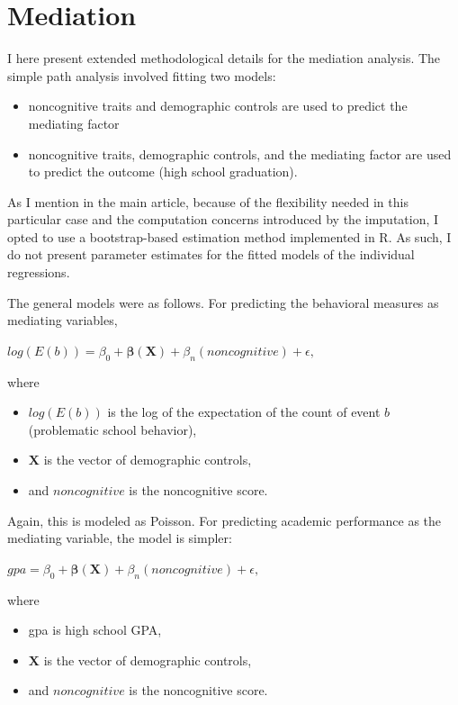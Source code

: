 \documentclass[11pt]{article}
\begin{document}
\section{Mediation}
I here present extended methodological details for the mediation analysis. The simple path analysis involved fitting two models: 
\begin{itemize}\itemsep1pt \parskip0pt 
	\item noncognitive traits and demographic controls are used to predict the mediating factor
	\item noncognitive traits, demographic controls, and the mediating factor are used to predict the outcome (high school graduation).
\end{itemize}

As I mention in the main article, because of the flexibility needed in this particular case and the computation concerns introduced by the imputation, I opted to use a bootstrap-based estimation method implemented in R. As such, I do not present parameter estimates for the fitted models of the individual regressions.

The general models were as follows. For predicting the behavioral measures as mediating variables,

\vspace{5mm}
$log(E(b)) = \beta_0 + \boldsymbol{\beta}(\mathbf{X})+ \beta_n(noncognitive)+\epsilon,$
\vspace{5mm}

\noindent where

\begin{itemize}\itemsep1pt \parskip0pt 
	\item $log(E(b))$ is the log of the expectation of the count of event $b$ (problematic school behavior),
	\item $\mathbf{X}$ is the vector of demographic controls,
	\item and $noncognitive$ is the noncognitive score.
\end{itemize}

Again, this is modeled as Poisson. For predicting academic performance as the mediating variable, the model is simpler:

\vspace{5mm}
$gpa = \beta_0 + \boldsymbol{\beta}(\mathbf{X})+ \beta_n(noncognitive)+\epsilon,$
\vspace{5mm}

\noindent where
\begin{itemize}\itemsep1pt \parskip0pt 
	\item gpa is high school GPA,
	\item $\mathbf{X}$ is the vector of demographic controls,
	\item and $noncognitive$ is the noncognitive score.
\end{itemize}
\end{document}
